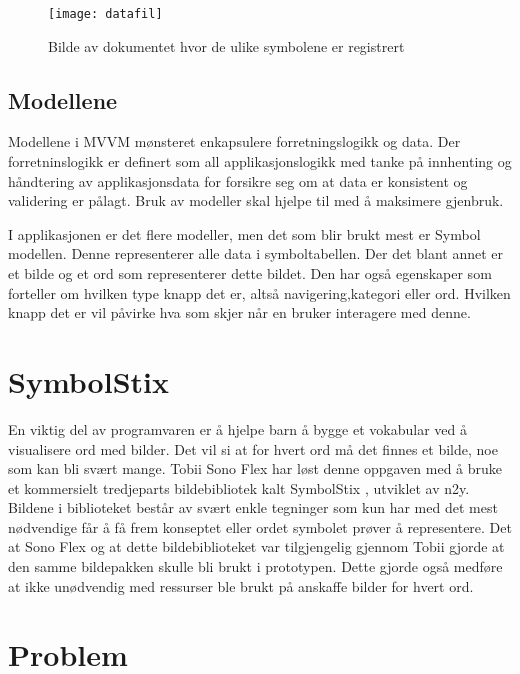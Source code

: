 {\begin{figure}[ht!] 
\centering 
\texttt{[image: datafil]} 
\caption{Bilde av dokumentet hvor de ulike symbolene er registrert} 
\label{fig:dok} 
\end{figure} 


\subsection{Modellene}

Modellene i MVVM mønsteret enkapsulere forretningslogikk og data. Der forretninslogikk er definert som all applikasjonslogikk med tanke på innhenting og håndtering av applikasjonsdata for forsikre seg om at data er konsistent og validering er pålagt. Bruk av modeller skal hjelpe til med å maksimere gjenbruk.

I applikasjonen er det flere modeller, men det som blir brukt mest er Symbol modellen. Denne representerer alle data i symboltabellen. Der det blant annet er et bilde og et ord som representerer dette bildet. Den har også egenskaper som forteller om hvilken type knapp det er, altså navigering,kategori eller ord. Hvilken knapp det er vil påvirke hva som skjer når en bruker interagere med denne.



\section{SymbolStix} 
 
En viktig del av programvaren er å hjelpe barn å bygge et vokabular ved å visualisere ord med bilder. Det vil si at for hvert ord må det finnes et bilde, noe som kan bli svært mange. Tobii Sono Flex har løst denne oppgaven med å bruke et kommersielt tredjeparts bildebibliotek kalt SymbolStix \cite{n2y}, utviklet av n2y. Bildene i biblioteket består av svært enkle tegninger som kun har med det mest nødvendige får å få frem konseptet eller ordet symbolet prøver å representere. Det at Sono Flex og at dette bildebiblioteket var tilgjengelig gjennom Tobii gjorde at den samme bildepakken skulle bli brukt i prototypen. Dette gjorde også medføre at ikke unødvendig med ressurser ble brukt på anskaffe bilder for hvert ord. 
 

\section{Problem} 
 
}
